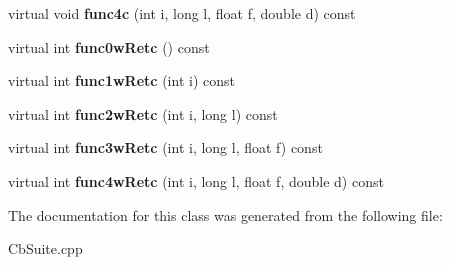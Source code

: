 \begin{DoxyCompactItemize}
\item 
virtual void {\bfseries func4c} (int i, long l, float f, double d) const \label{classX_a3476875b175eca0ab732613facc36863}

\item 
virtual int {\bfseries func0w\+Retc} () const \label{classX_aa52122aa7a0038383ceaf31ab857da59}

\item 
virtual int {\bfseries func1w\+Retc} (int i) const \label{classX_aa2fe309b3268b8b939dbaac3e0b7ead3}

\item 
virtual int {\bfseries func2w\+Retc} (int i, long l) const \label{classX_a87181de33b332365eb473ca7269be957}

\item 
virtual int {\bfseries func3w\+Retc} (int i, long l, float f) const \label{classX_a104489df29261c06269b726f815535ca}

\item 
virtual int {\bfseries func4w\+Retc} (int i, long l, float f, double d) const \label{classX_af3f1b0d3433c82aa76758c8a6b66ff72}

\end{DoxyCompactItemize}


The documentation for this class was generated from the following file\+:\begin{DoxyCompactItemize}
\item 
Cb\+Suite.\+cpp\end{DoxyCompactItemize}
